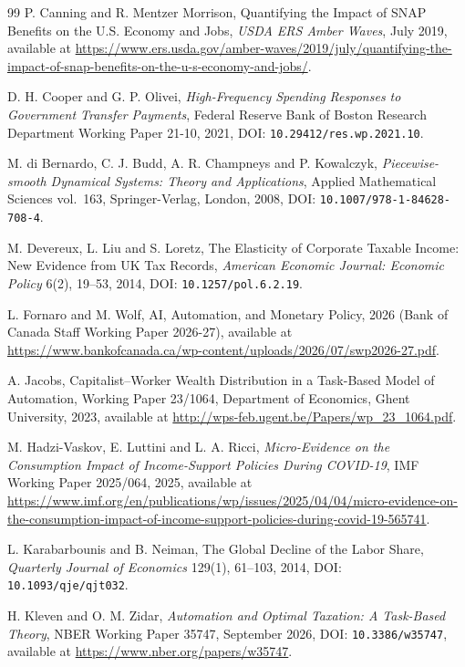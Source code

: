 \documentclass[review,12pt]{elsarticle}
\theoremstyle{plain}
\theoremstyle{definition}
\theoremstyle{remark}
\begin{document}
\begin{thebibliography}{99}
 P. Canning and R. Mentzer Morrison, Quantifying the Impact of SNAP Benefits on the U.S. Economy and Jobs, \emph{USDA ERS Amber Waves}, July 2019, available at \url{https://www.ers.usda.gov/amber-waves/2019/july/quantifying-the-impact-of-snap-benefits-on-the-u-s-economy-and-jobs/}.

 D. H. Cooper and G. P. Olivei, \emph{High-Frequency Spending Responses to Government Transfer Payments}, Federal Reserve Bank of Boston Research Department Working Paper 21-10, 2021, DOI: \texttt{10.29412/res.wp.2021.10}.

 M. di Bernardo, C. J. Budd, A. R. Champneys and P. Kowalczyk, \emph{Piecewise-smooth Dynamical Systems: Theory and Applications}, Applied Mathematical Sciences vol.~163, Springer-Verlag, London, 2008, DOI: \texttt{10.1007/978-1-84628-708-4}.

 M. Devereux, L. Liu and S. Loretz, The Elasticity of Corporate Taxable Income: New Evidence from UK Tax Records, \emph{American Economic Journal: Economic Policy} 6(2), 19--53, 2014, DOI: \texttt{10.1257/pol.6.2.19}.

 L. Fornaro and M. Wolf, AI, Automation, and Monetary Policy, 2026 (Bank of Canada Staff Working Paper 2026-27), available at \url{https://www.bankofcanada.ca/wp-content/uploads/2026/07/swp2026-27.pdf}.

 A. Jacobs, Capitalist--Worker Wealth Distribution in a Task-Based Model of Automation, Working Paper 23/1064, Department of Economics, Ghent University, 2023, available at \url{http://wps-feb.ugent.be/Papers/wp_23_1064.pdf}.

 M. Hadzi-Vaskov, E. Luttini and L. A. Ricci, \emph{Micro-Evidence on the Consumption Impact of Income-Support Policies During COVID-19}, IMF Working Paper 2025/064, 2025, available at \url{https://www.imf.org/en/publications/wp/issues/2025/04/04/micro-evidence-on-the-consumption-impact-of-income-support-policies-during-covid-19-565741}.

 L. Karabarbounis and B. Neiman, The Global Decline of the Labor Share, \emph{Quarterly Journal of Economics} 129(1), 61--103, 2014, DOI: \texttt{10.1093/qje/qjt032}.

 H. Kleven and O. M. Zidar, \emph{Automation and Optimal Taxation: A Task-Based Theory}, NBER Working Paper 35747, September 2026, DOI: \texttt{10.3386/w35747}, available at \url{https://www.nber.org/papers/w35747}.


\end{thebibliography}
\end{document}
